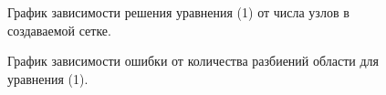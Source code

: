 \documentclass[a4paper,12pt]{article}
\theoremstyle{plain} %
\theoremstyle{definition} %
\theoremstyle{remark} %
\theoremstyle{definition}
\theoremstyle{definition}
\begin{document}
\begin{figure}[H]
\begin{minipage}[h]{0.47\linewidth}
				\end{minipage}
				\hfill
				\begin{minipage}[h]{0.47\linewidth}
				\end{minipage}
				\caption{График зависимости решения уравнения (1) от числа узлов в создаваемой сетке.}
				\label{ris:func_1_res}
			\end{figure}
		
				\begin{figure}[H]
				\caption{График зависимости ошибки от количества разбиений области для уравнения (1).}
			\end{figure}
		
\end{document}
